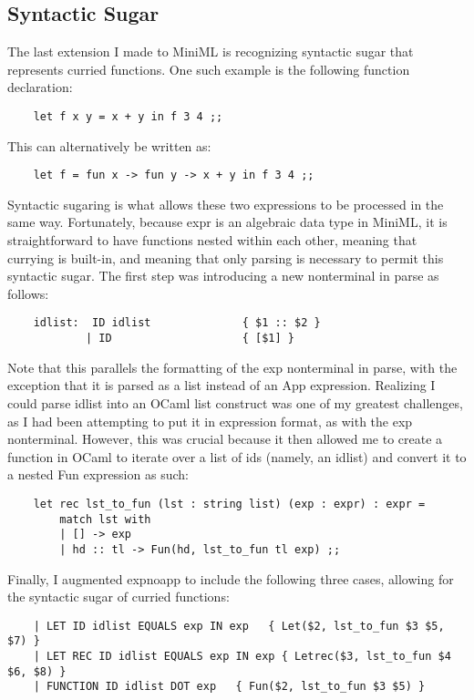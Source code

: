 \documentclass{article}
\begin{document}
\subsection*{Syntactic Sugar}
The last extension I made to MiniML is recognizing syntactic sugar that represents curried functions. One such example is the following function declaration: 
\begin{verbatim}
    let f x y = x + y in f 3 4 ;;
\end{verbatim}
This can alternatively be written as:
\begin{verbatim}
    let f = fun x -> fun y -> x + y in f 3 4 ;;
\end{verbatim}
Syntactic sugaring is what allows these two expressions to be processed in the same way. Fortunately, because expr is an algebraic data type in MiniML, it is straightforward to have functions nested within each other, meaning that currying is built-in, and meaning that only parsing is necessary to permit this syntactic sugar. The first step was introducing a new nonterminal in parse as follows:
\begin{verbatim}
    idlist:  ID idlist              { $1 :: $2 }
            | ID                    { [$1] }
\end{verbatim}

Note that this parallels the formatting of the exp nonterminal in parse, with the exception that it is parsed as a list instead of an App expression. Realizing I could parse idlist into an OCaml list construct was one of my greatest challenges, as I had been attempting to put it in expression format, as with the exp nonterminal. However, this was crucial because it then allowed me to create a function in OCaml to iterate over a list of ids (namely, an idlist) and convert it to a nested Fun expression as such:

\begin{verbatim}
    let rec lst_to_fun (lst : string list) (exp : expr) : expr = 
        match lst with
        | [] -> exp
        | hd :: tl -> Fun(hd, lst_to_fun tl exp) ;;
\end{verbatim}

Finally, I augmented expnoapp to include the following three cases, allowing for the syntactic sugar of curried functions:

\begin{verbatim}
    | LET ID idlist EQUALS exp IN exp   { Let($2, lst_to_fun $3 $5, $7) }
    | LET REC ID idlist EQUALS exp IN exp { Letrec($3, lst_to_fun $4 $6, $8) }
    | FUNCTION ID idlist DOT exp   { Fun($2, lst_to_fun $3 $5) }
\end{verbatim}
\end{document}
